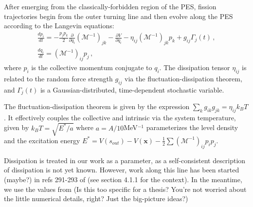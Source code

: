 After emerging from the classically-forbidden region of the PES, fission trajectories begin from the outer turning
line and then evolve along the PES according to the Langevin equations:
\begin{gather}\label{eq:langevin} 
	\frac{dp_i}{dt} =  
	-\frac{p_j p_k}{2} \frac{\partial}{\partial q_i}\left(\mathcal{M}^{-1}\right)_{jk} 
	- \frac{\partial V}{\partial q_i}  - \eta_{ij}\left(\mathcal{M}^{-1}\right)_{jk} p_k + g_{ij}\Gamma_j(t) \,, \\ 
	\frac{dq_i}{dt} = 	\left(\mathcal{M}^{-1}\right)_{ij} p_j \,,  
\end{gather} 
where $p_i$ is the collective momentum conjugate to $q_i$. The dissipation
tensor $\eta_{ij}$ is related to the random force strength $g_{ij}$ via the
fluctuation-dissipation theorem, and $\Gamma_j(t)$ is a Gaussian-distributed,
time-dependent stochastic variable.

The fluctuation-dissipation theorem is given by the expression $\sum_k g_{ik}g_{jk} = \eta_{ij}k_BT$. It effectively couples the collective and intrinsic via the system temperature, given by $k_BT = \sqrt{E^*/a}$ where $a=A/10$MeV$^{-1}$ parameterizes the level density and the excitation energy $E^* = V(s_{out}) - V(\mathbf{x}) - \frac{1}{2}\sum\left(\mathcal{M}^{-1}\right)_{ij}p_i p_j$.

Dissipation is treated in our work as a parameter, as a self-consistent description of dissipation is not yet known. However, work along this line has been started (maybe?) in refs 291-293 of \cite{Schmidt2018} (see section 4.1.1 for the context). In the meantime, we use the values from \cite{Sadhukhan2016} (Is this too specific for a thesis? You're not worried about the little numerical details, right? Just the big-picture ideas?)

